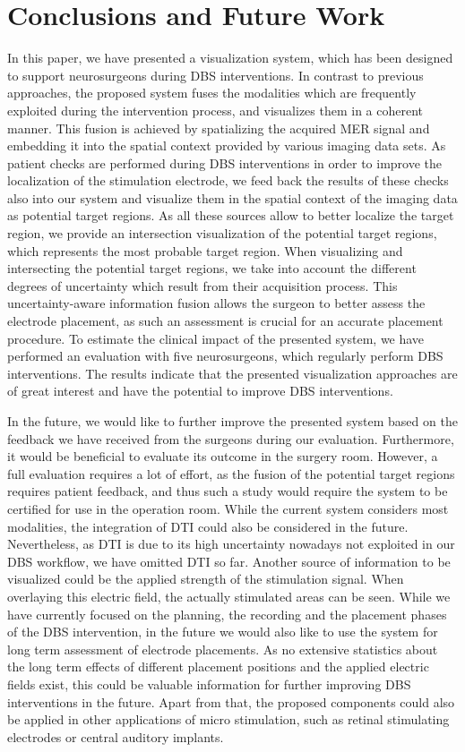 \documentclass{vgtc}                          %
\begin{document}
\section{Conclusions and Future Work}\label{sec:conclusions}
In this paper, we have presented a visualization system, which has been designed to support neurosurgeons during DBS interventions. In contrast to previous approaches, the proposed system fuses the modalities which are frequently exploited during the intervention process, and visualizes them in a coherent manner. This fusion is achieved by spatializing the acquired MER signal and embedding it into the spatial context provided by various imaging data sets. As patient checks are performed during DBS interventions in order to improve the localization of the stimulation electrode, we feed back the results of these checks also into our system and visualize them in the spatial context of the imaging data as potential target regions. As all these sources allow to better localize the target region, we provide an intersection visualization of the potential target regions, which represents the most probable target region. When visualizing and intersecting the potential target regions, we take into account the different degrees of uncertainty which result from their acquisition process. This uncertainty-aware information fusion allows the surgeon to better assess the electrode placement, as such an assessment is crucial for an accurate placement procedure. To estimate the clinical impact of the presented system, we have performed an evaluation with five neurosurgeons, which regularly perform DBS interventions. The results indicate that the presented visualization approaches are of great interest and have the potential to improve DBS interventions.

In the future, we would like to further improve the presented system based on the feedback we have received from the surgeons during our evaluation. Furthermore, it would be beneficial to evaluate its outcome in the surgery room. However, a full evaluation requires a lot of effort, as the fusion of the potential target regions requires patient feedback, and thus such a study would require the system to be certified for use in the operation room. While the current system considers most modalities, the integration of DTI could also be considered in the future. Nevertheless, as DTI is due to its high uncertainty nowadays not exploited in our DBS workflow, we have omitted DTI so far. Another source of information to be visualized could be the applied strength of the stimulation signal. When overlaying this electric field, the actually stimulated areas can be seen. While we have currently focused on the planning, the recording and the placement phases of the DBS intervention, in the future we would also like to use the system for long term assessment of electrode placements. As no extensive statistics about the long term effects of different placement positions and the applied electric fields exist, this could be valuable information for further improving DBS interventions in the future. Apart from that, the proposed components could also be applied in other applications of micro stimulation, such as retinal stimulating electrodes or central auditory implants.
\end{document}
